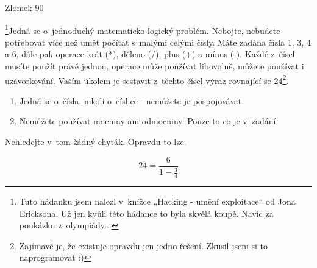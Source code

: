 Zlomek
90 %

\footnote{Tuto hádanku jsem nalezl v~knížce „Hacking - umění exploitace“ od Jona Ericksona. Už jen kvůli této hádance to byla skvělá koupě. Navíc za poukázku z~olympiády...}Jedná se o~jednoduchý matematicko-logický problém. Nebojte, nebudete potřebovat více než umět počítat s~malými celými čísly. Máte zadána čísla 1, 3, 4 a 6, dále pak operace krát (*), děleno (/), plus (+) a mínus (-). Každé z~čísel musíte použít právě jednou, operace může používat libovolně, můžete používat i uzávorkování. Vaším úkolem je sestavit z~těchto čísel výraz rovnající se 24\footnote{Zajímavé je, že existuje opravdu jen jedno řešení. Zkusil jsem si to naprogramovat :)}.

\begin{enumerate}
\item Jedná se o~čísla, nikoli o~číslice - nemůžete je pospojovávat.
\item Nemůžete používat mocniny ani odmocniny. Pouze to co je v~zadání
\end{enumerate}

Nehledejte v~tom žádný chyták. Opravdu to lze.

\[24=\frac{6}{1-\frac{3}{4}}\]
